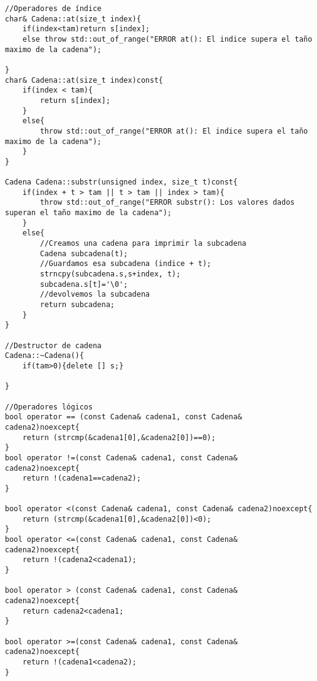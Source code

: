 \begin{verbatim}
//Operadores de índice
char& Cadena::at(size_t index){
    if(index<tam)return s[index];
    else throw std::out_of_range("ERROR at(): El indice supera el taño maximo de la cadena");

}
char& Cadena::at(size_t index)const{
    if(index < tam){
        return s[index];
    }
    else{
        throw std::out_of_range("ERROR at(): El indice supera el taño maximo de la cadena");
    }
}

Cadena Cadena::substr(unsigned index, size_t t)const{
    if(index + t > tam || t > tam || index > tam){
        throw std::out_of_range("ERROR substr(): Los valores dados superan el taño maximo de la cadena");
    }
    else{
        //Creamos una cadena para imprimir la subcadena
        Cadena subcadena(t);
        //Guardamos esa subcadena (indice + t);
        strncpy(subcadena.s,s+index, t);
        subcadena.s[t]='\0';
        //devolvemos la subcadena
        return subcadena;
    }
}

//Destructor de cadena
Cadena::~Cadena(){
    if(tam>0){delete [] s;}
    
}

//Operadores lógicos
bool operator == (const Cadena& cadena1, const Cadena& cadena2)noexcept{
    return (strcmp(&cadena1[0],&cadena2[0])==0);
}
bool operator !=(const Cadena& cadena1, const Cadena& cadena2)noexcept{
    return !(cadena1==cadena2);
}

bool operator <(const Cadena& cadena1, const Cadena& cadena2)noexcept{
    return (strcmp(&cadena1[0],&cadena2[0])<0);
}
bool operator <=(const Cadena& cadena1, const Cadena& cadena2)noexcept{
    return !(cadena2<cadena1);
}

bool operator > (const Cadena& cadena1, const Cadena& cadena2)noexcept{
    return cadena2<cadena1;
}

bool operator >=(const Cadena& cadena1, const Cadena& cadena2)noexcept{
    return !(cadena1<cadena2);
}
\end{verbatim}